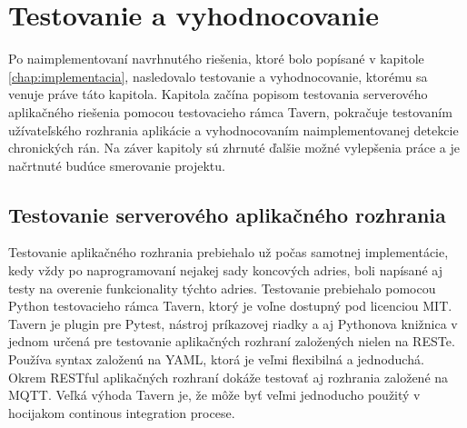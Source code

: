 \chapter{Testovanie a vyhodnocovanie}
\label{chap:testovanie-vyhodnocovanie}
Po naimplementovaní navrhnutého riešenia, ktoré bolo popísané v kapitole \ref{chap:implementacia}, nasledovalo testovanie a vyhodnocovanie, ktorému sa venuje práve táto kapitola.  Kapitola začína popisom testovania serverového aplikačného riešenia pomocou testovacieho rámca Tavern, pokračuje testovaním užívateľského rozhrania aplikácie a vyhodnocovaním naimplementovanej detekcie chronických rán. Na záver kapitoly sú zhrnuté ďalšie možné vylepšenia práce a je načrtnuté budúce smerovanie projektu. 

\section{Testovanie serverového aplikačného rozhrania}
Testovanie aplikačného rozhrania prebiehalo už počas samotnej implementácie, kedy vždy po naprogramovaní nejakej sady koncových adries, boli napísané aj testy na overenie funkcionality týchto adries. Testovanie prebiehalo pomocou Python testovacieho rámca Tavern, ktorý je voľne dostupný pod licenciou MIT. Tavern je plugin pre Pytest, nástroj príkazovej riadky a aj Pythonova knižnica v jednom určená pre testovanie aplikačných rozhraní založených nielen na RESTe. Používa syntax založenú na YAML, ktorá je veľmi flexibilná a jednoduchá. Okrem RESTful aplikačných rozhraní dokáže testovať aj rozhrania založené na MQTT. Veľká výhoda Tavern je, že môže byť veľmi jednoducho použitý v hocijakom continous integration procese. \cite{AXUaooptJGOSpUrX} 

